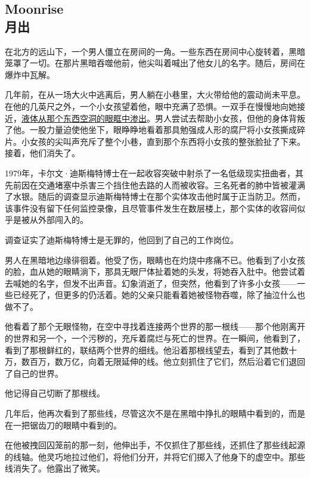 \subsection[月出]{Moonrise \\
月出}

\label{subsec:TALE-moonrise}

在北方的远山下，一个男人僵立在房间的一角。一些东西在房间中心旋转着，黑暗笼罩了一切。在那片黑暗吞噬他前，他尖叫着喊出了他女儿的名字。随后，房间在爆炸中瓦解。

\hr

几年前，在从一场大火中逃离后，男人躺在小巷里，大火带给他的震动尚未平息。在他的几英尺之外，一个小女孩望着他，眼中充满了恐惧。一双手在慢慢地向她接近，\hyperref[chap:SCP-106]{液体从那个东西空洞的眼眶中渗出}。男人尝试去帮助小女孩，但他的身体背叛了他。一股力量迫使他坐下，眼睁睁地看着那具勉强成人形的腐尸将小女孩撕成碎片。小女孩的尖叫声充斥了整个小巷，直到那个东西将小女孩的整张脸扯了下来。接着，他们消失了。

\hr

1979年，卡尔文·迪斯梅特博士在一起收容突破中射杀了一名低级现实扭曲者，其先前因在交通堵塞中杀害三个挡住他去路的人而被收容。三名死者的肺中皆被灌满了水银。随后的调查显示迪斯梅特博士在那个实体攻击他时属于正当防卫。然而，该事件没有留下任何监控录像，且尽管事件发生在数层楼上，那个实体的收容间似乎是被从外部闯入的。

调查证实了迪斯梅特博士是无罪的，他回到了自己的工作岗位。

\hr

男人在黑暗地边缘徘徊着。他受了伤，眼睛也在灼烧中疼痛不已。他看到了小女孩的脸，血从她的眼睛淌下，那具无眼尸体扯着她的头发，将她吞入肚中。他尝试着去喊她的名字，但发不出声音。幻象消逝了，但突然，他看到了许多小女孩——一些已经死了，但更多的仍活着。她的父亲只能看着她被怪物吞噬，除了抽泣什么也做不了。

他看着了那个无眼怪物，在空中寻找着连接两个世界的那一根线——那个他刚离开的世界和另一个，一个污秽的，充斥着腐烂与死亡的世界。在一瞬间，他看到了，看到了那根鲜红的，联结两个世界的细线。他沿着那根线望去，看到了其他数十万，数百万，数万亿，向着无限延伸的线。他立刻抓住了它们，然后沿着它们退回了自己的世界。

他记得自己切断了那根线。

\hr

几年后，他再次看到了那些线，尽管这次不是在黑暗中挣扎的眼睛中看到的，而是在一把锯齿刀的眼睛中看到的。

在他被拽回囚笼前的那一刻，他伸出手，不仅抓住了那些线，还抓住了那些线起源的线轴。他灵巧地拉过他们，将他们分开，并将它们掷入了他身下的虚空中。那些线消失了。他露出了微笑。

